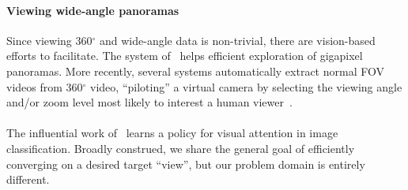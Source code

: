 \paragraph{Viewing wide-angle panoramas}
Since viewing 360$^{\circ}$ and wide-angle data is non-trivial, there are vision-based efforts to facilitate.  The system of~\cite{kopf2007capturing} helps efficient exploration of gigapixel panoramas.  
More recently, several systems automatically extract normal FOV videos from 360$^{\circ}$ video, ``piloting'' a virtual camera by selecting the viewing angle and/or zoom level most likely to interest a human viewer~\cite{su2016pano2vid,su2017making,hu2017deep,lai2017semantic}.






\vspace*{-0.1in}
\paragraph{}


  The influential work of~\cite{mnih2014recurrent}
  learns a policy for visual attention in image classification.   Broadly construed, we share the general goal of efficiently converging on a desired target ``view'', but our problem domain is entirely different.
  









  
